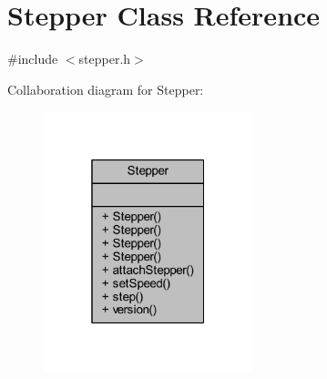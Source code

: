 \hypertarget{class_stepper}{}\section{Stepper Class Reference}
\label{class_stepper}


{\ttfamily \#include $<$stepper.\+h$>$}



Collaboration diagram for Stepper\+:\nopagebreak
\begin{figure}[H]
\begin{center}
\leavevmode
\includegraphics[width=172pt]{class_stepper__coll__graph}
\end{center}
\end{figure}
